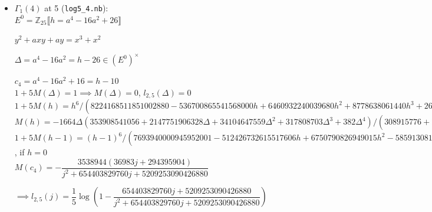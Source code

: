 \documentclass{rs}
\theoremstyle{definition}
\theoremstyle{remark}
\newcommand{\mb}[1]{\mathbb{#1}}
\newcommand{\BZ}{{\mb Z}}
\renewcommand{\D}{\Delta}
\newcommand{\G}{\Gamma}
\newcommand{\lb}{\llbracket}
\newcommand{\rb}{\rrbracket}
\renewcommand{\=}{\approx}
\renewcommand{\-}{\sim}
\numberwithin{equation}{section}
\numberwithin{thm}{section}
\begin{document}
\begin{itemize}
 $1 + 3 M(a) = 1 + 3 M(a \pm 4) = -1 \implies M(a) = M(a \pm 4) = -\dfrac{2}{3}$, $l_{2,3}(a) = l_{2,3}(a \pm 4) = 0$\footnote{``We resort to Iwasawa's `$\log_p$' artifice.''  
 See [Koblitz, exercise 7 of \S III.4].  } 

 $\implies 1 + 3 M(\D) = 1 \implies M(\D) = 0$, $l_{2,3}(\D) = 0$ \\

 $1 + 3 M(h) = \dfrac{h^4}{h^4 + 3 \cdot 2^{12} h^2 - 3 \cdot 2^{18}} \implies M(h) = -\dfrac{2^{12} \Delta}{\D^2 + 97 \cdot 2^{7} \D + 2^{12}}$ \\

 $M(c_4) = -\dfrac{4096000}{j + 12288000}$ \hfill $\implies l_{2,3}(j) = \dfrac{1}{3} \log\left(1 - \dfrac{12288000}{j + 12288000}\right)$ 

 $M(c_6) = \dfrac{602112 (85 j + 991488)}{j^2 - 153542016 j - 1790957481984}$ \\

 \item $\G_1(4)$ at 5 (\texttt{log5\_4.nb}): \\

 $E^0 = \BZ_{25} \lb h = a^4 - 16 a^2 + 26 \rb$ 

 $y^2 + a x y + a y = x^3 + x^2$ 

 $\Delta = a^4 - 16 a^2 = h - 26 \in (E^0)^\times$ 

 $c_4 = a^4 - 16 a^2 + 16 = h - 10$ \\

 $1 + 5 M(\D) = 1 \implies M(\Delta) = 0$, $l_{2,5}(\D) = 0$ \\

 $1 + 5 M(h) = h^6 / (8224168511851002880 - 536700865541568000 h + 6460932240039680 h^2 + 
  8778638061440 h^3 + 2643755237760 h^4 + 3178240 h^5 + h^6) \implies$ \\
 $M(h) = -1664 \D (353908541056 + 2147751906328 \D + 34104647559 \D^2 + 317808703 \D^3 + 
  382 \D^4) / (308915776 + 2944519132874176 \D + 17869295867503600 \D^2 + 
  283750668042400 \D^3 + 2644168419100 \D^4 + 3178396 \D^5 + \D^6)$ \\

 $1 + 5 M(h - 1) = (h - 1)^6 / (7693940000945952001 - 512426732615517606 h + 6750790826949015 h^2 - 
 585913081520 h^3 + 2354355753765 h^4 + 2893719 h^5 + h^6) = 1 / 7693940000945952001$, if $h = 0$ \\

 $M(c_4) = -\dfrac{3538944 (36983 j + 294395904)}{j^2 + 654403829760 j + 
  5209253090426880}$ 

 \hfill $\implies l_{2,5}(j) = \dfrac{1}{5} \log\left(1 - \dfrac{654403829760 j + 
  5209253090426880}{j^2 + 654403829760 j + 
  5209253090426880}\right)$ 
\end{itemize}
\end{document}
